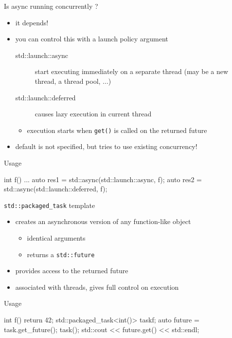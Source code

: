 \begin{frame}[fragile]
  \begin{block}{Is async running concurrently ?}
    \begin{itemize}
    \item it depends!
    \item you can control this with a launch policy argument
      \begin{description}
      \item[std::launch::async] start executing immediately on a separate thread (may be a new thread, a thread pool, ...)
      \item[std::launch::deferred] causes lazy execution in current thread
      \end{description}
      \begin{itemize}
      \item execution starts when \texttt{get()} is called on the returned future
      \end{itemize}
    \item default is not specified, but tries to use existing concurrency!
    \end{itemize}
  \end{block}
  \pause
  \begin{exampleblock}{Usage}
    \begin{cppcode*}{}
      int f() {...}
      auto res1 = std::async(std::launch::async, f);
      auto res2 = std::async(std::launch::deferred, f);
    \end{cppcode*}
  \end{exampleblock}
\end{frame}

\begin{frame}[fragile]
  \begin{block}{\texttt{std::packaged\_task} template}
    \begin{itemize}
    \item creates an asynchronous version of any function-like object
      \begin{itemize}
      \item identical arguments
      \item returns a \texttt{std::future}
      \end{itemize}
    \item provides access to the returned future
    \item associated with threads, gives full control on execution
    \end{itemize}
  \end{block}
  \pause
  \begin{exampleblock}{Usage}
    \begin{cppcode*}{}
      int f() { return 42; }
      std::packaged_task<int()> task{f};
      auto future = task.get_future();
      task();
      std::cout << future.get() << std::endl;
    \end{cppcode*}
  \end{exampleblock}
\end{frame}
